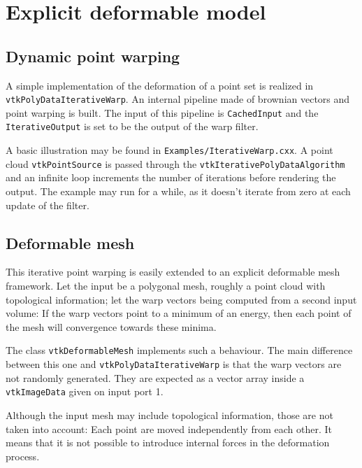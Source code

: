 \documentclass{InsightArticle}
\begin{document}
\section{Explicit deformable model}
%
\subsection{Dynamic point warping}
%
A simple implementation of the deformation of a point set is realized in
\verb!vtkPolyDataIterativeWarp!. An internal pipeline made of brownian vectors
and point warping is built. The input of this pipeline is \verb!CachedInput!
and the \verb!IterativeOutput! is set to be the output of the warp filter.

A basic illustration may be found in \verb!Examples/IterativeWarp.cxx!. A point
cloud \verb!vtkPointSource! is passed through the 
\verb!vtkIterativePolyDataAlgorithm! and an infinite loop increments the 
number of iterations before rendering the output. The example may run for a 
while, as it doesn't iterate from zero at each update of the filter.
%
\subsection{Deformable mesh}
%
This iterative point warping is easily extended to an explicit deformable mesh
framework. Let the input be a polygonal mesh, roughly a point cloud with 
topological information; let the warp vectors being computed from a second
input volume: If the warp vectors point to a minimum of an energy, then each
point of the mesh will convergence towards these minima.

The class \verb!vtkDeformableMesh! implements such a behaviour. The main 
difference between this one and \verb!vtkPolyDataIterativeWarp! is that the warp
vectors are not randomly generated. They are expected as a vector array inside 
a \verb!vtkImageData! given on input port 1.

Although the input mesh may include topological information, those are not taken
into account: Each point are moved independently from each other. It means that
it is not possible to introduce internal forces in the deformation process.
\end{document}
